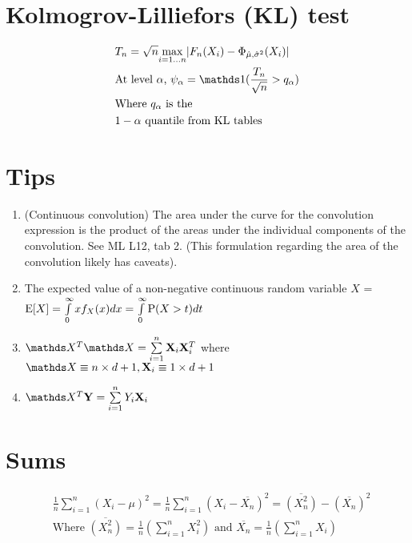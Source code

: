 \section {Kolmogrov-Lilliefors (KL) test}
\begin {equation} \begin {split}
& T_n = \sqrt{n} \underset{i = 1 \ldots n} {\max} \abs {F_n(X_i) - \Phi_{\hat \mu, \hat \sigma^2}(X_i)} \\
& \text {At level $\alpha$, } \psi_{\alpha}  = \ind{\frac {T_n}{\sqrt{n}} > q_{\alpha}} \\
& \text {Where $q_{\alpha}$ is the} \\
& \text {$1 - \alpha$ quantile from KL tables} \\
\end {split} \end {equation}

\section {Tips}
\begin {enumerate}
\item (Continuous convolution) The area under the curve for the convolution expression is the product of the areas under the individual components of the convolution. See ML L12, tab 2. (This formulation regarding the area of the convolution likely has caveats).
\item The expected value of a non-negative continuous random variable $X$ = $\mathrm{E}[X] = \int \limits_0^\infty x f_X(x) dx = \int \limits_0^\infty \mathrm{P} (X > t) dt$
\item $\mX^T \mX = \sum \limits_{i=1}^{n} \vX_i \vX_i^T$ where $\mX \equiv n \times d + 1, \vX_i \equiv 1 \times d + 1$
\item $\mX^T \vY = \sum \limits_{i=1}^{n} Y_i \vX_i$
\end {enumerate}

\section {Sums}
\begin {equation} \begin {split}
& \frac {1} {n} {\sum \limits_{i=1}^{n} (X_i - \mu)^2} = \frac {1} {n} {\sum \limits_{i=1}^{n} (X_i - \overline{X_n})^2} = \overline{(X_n^2)} - (\overline{X_n})^2  \\
& \text {Where } \overline{(X_n^2)} = \frac {1}{n} (\sum \limits_{i=1}^{n} X_i^2) \text { and } \overline{X_n} = \frac {1}{n} (\sum \limits_{i=1}^{n} X_i) \\
\end {split} \end {equation}

